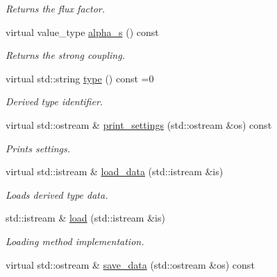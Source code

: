 \begin{DoxyCompactItemize}
\begin{DoxyCompactList}\small\item\em Returns the flux factor. \end{DoxyCompactList}\item 
\hypertarget{a00304_a235e07225bd71429967293fd8ffa59e3}{virtual value\-\_\-type \hyperlink{a00304_a235e07225bd71429967293fd8ffa59e3}{alpha\-\_\-s} () const }\label{a00304_a235e07225bd71429967293fd8ffa59e3}

\begin{DoxyCompactList}\small\item\em Returns the strong coupling. \end{DoxyCompactList}\item 
\hypertarget{a00304_abb55d9db34760632146d32786064d4de}{virtual std\-::string \hyperlink{a00304_abb55d9db34760632146d32786064d4de}{type} () const =0}\label{a00304_abb55d9db34760632146d32786064d4de}

\begin{DoxyCompactList}\small\item\em Derived type identifier. \end{DoxyCompactList}\item 
\hypertarget{a00304_aedbcaa7f7e09d1653fad1441e692be98}{virtual std\-::ostream \& \hyperlink{a00304_aedbcaa7f7e09d1653fad1441e692be98}{print\-\_\-settings} (std\-::ostream \&os) const }\label{a00304_aedbcaa7f7e09d1653fad1441e692be98}

\begin{DoxyCompactList}\small\item\em Prints settings. \end{DoxyCompactList}\item 
\hypertarget{a00304_a6e437292007ed210b4d7cd894c2459ec}{virtual std\-::istream \& \hyperlink{a00304_a6e437292007ed210b4d7cd894c2459ec}{load\-\_\-data} (std\-::istream \&is)}\label{a00304_a6e437292007ed210b4d7cd894c2459ec}

\begin{DoxyCompactList}\small\item\em Loads derived type data. \end{DoxyCompactList}\item 
\hypertarget{a00304_a0f4f26bf68d38dae4428279db6e22d83}{std\-::istream \& \hyperlink{a00304_a0f4f26bf68d38dae4428279db6e22d83}{load} (std\-::istream \&is)}\label{a00304_a0f4f26bf68d38dae4428279db6e22d83}

\begin{DoxyCompactList}\small\item\em Loading method implementation. \end{DoxyCompactList}\item 
\hypertarget{a00304_aec10c9a2a9fdb69f759eef520dda0c7a}{virtual std\-::ostream \& \hyperlink{a00304_aec10c9a2a9fdb69f759eef520dda0c7a}{save\-\_\-data} (std\-::ostream \&os) const }\label{a00304_aec10c9a2a9fdb69f759eef520dda0c7a}


\end{DoxyCompactItemize}
